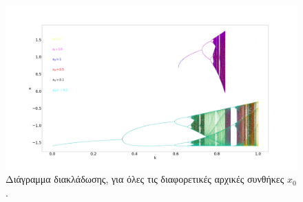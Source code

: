 \begin{figure}[ht]
	\centering
	\includegraphics[width=1\linewidth]{LateX images/graphs q16/g30}
	\caption{Διάγραμμα διακλάδωσης, για όλες τις διαφορετικές αρχικές συνθήκες $x_0$.}
	\label{f:g232}
\end{figure}

